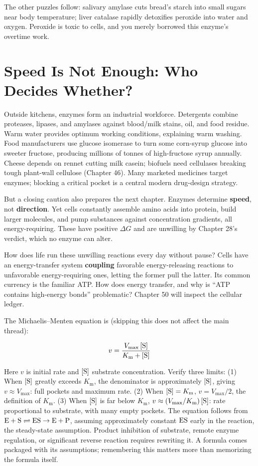 The other puzzles follow: salivary amylase cuts bread's starch into small sugars near body temperature; liver catalase rapidly detoxifies peroxide into water and oxygen. Peroxide is toxic to cells, and you merely borrowed this enzyme's overtime work.

\section{Speed Is Not Enough: Who Decides Whether?}

Outside kitchens, enzymes form an industrial workforce. Detergents combine proteases, lipases, and amylases against blood/milk stains, oil, and food residue. Warm water provides optimum working conditions, explaining warm washing. Food manufacturers use glucose isomerase to turn some corn-syrup glucose into sweeter fructose, producing millions of tonnes of high-fructose syrup annually. Cheese depends on rennet cutting milk casein; biofuels need cellulases breaking tough plant-wall cellulose (Chapter 46). Many marketed medicines target enzymes; blocking a critical pocket is a central modern drug-design strategy.

But a closing caution also prepares the next chapter. Enzymes determine \textbf{speed}, not \textbf{direction}. Yet cells constantly assemble amino acids into protein, build larger molecules, and pump substances against concentration gradients, all energy-requiring. These have positive $\Delta G$ and are unwilling by Chapter 28's verdict, which no enzyme can alter.

How does life run these unwilling reactions every day without pause? Cells have an energy-transfer system \textbf{coupling} favorable energy-releasing reactions to unfavorable energy-requiring ones, letting the former pull the latter. Its common currency is the familiar ATP. How does energy transfer, and why is ``ATP contains high-energy bonds'' problematic? Chapter 50 will inspect the cellular ledger.

\begin{tiaozhan}
The Michaelis--Menten equation is (skipping this does not affect the main thread):

\[v = \frac{V_{\max}\,[\mathrm{S}]}{K_{\mathrm{m}} + [\mathrm{S}]}\]

Here $v$ is initial rate and $[\mathrm{S}]$ substrate concentration. Verify three limits: (1) When $[\mathrm{S}]$ greatly exceeds $K_{\mathrm{m}}$, the denominator is approximately $[\mathrm{S}]$, giving $v\approx V_{\max}$: full pockets and maximum rate. (2) When $[\mathrm{S}]=K_{\mathrm{m}}$, $v = V_{\max}/2$, the definition of $K_{\mathrm{m}}$. (3) When $[\mathrm{S}]$ is far below $K_{\mathrm{m}}$, $v\approx (V_{\max}/K_{\mathrm{m}})\,[\mathrm{S}]$: rate proportional to substrate, with many empty pockets. The equation follows from $\mathrm{E}+\mathrm{S}\rightleftharpoons\mathrm{ES}\rightarrow\mathrm{E}+\mathrm{P}$, assuming approximately constant $\mathrm{ES}$ early in the reaction, the steady-state assumption. Product inhibition of substrate, remote enzyme regulation, or significant reverse reaction requires rewriting it. A formula comes packaged with its assumptions; remembering this matters more than memorizing the formula itself.
\end{tiaozhan}

